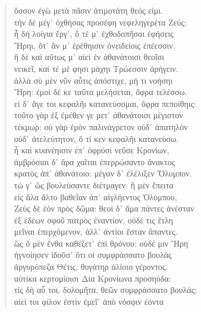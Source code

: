 \begin{Spacing}{1.5}
\begin{verse}
{\large\g ὅσσον ἐγὼ μετὰ πᾶσιν ἀτιμοτάτη θεός εἰμι.  } \\
{\large\g τὴν δὲ μέγ᾽ ὀχθήσας προσέφη νεφεληγερέτα Ζεύς:  } \\
{\large\g ἦ δὴ λοίγια ἔργ᾽, ὅ τέ μ᾽ ἐχθοδοπῆσαι ἐφήσεις  } \\
{\large\g Ἥρηι, ὅτ᾽ ἄν μ᾽ ἐρέθηισιν ὀνειδείοις ἐπέεσσιν.  } \\
{\large\g ἣ δὲ καὶ αὔτως μ᾽ αἰεὶ ἐν ἀθανάτοισι θεοῖσι  } \\
{\large\g νεικεῖ, καί τέ μέ φησι μάχηι Τρώεσσιν ἀρήγειν.  } \\
{\large\g ἀλλὰ σὺ μὲν νῦν αὖτις ἀπόστιχε, μή τι νοήσηι  } \\
{\large\g Ἥρη: ἐμοὶ δέ κε ταῦτα μελήσεται, ὄφρα τελέσσω.  } \\
{\large\g εἰ δ᾽ ἄγε τοι κεφαλῆι κατανεύσομαι, ὄφρα πεποίθηις:  } \\
{\large\g τοῦτο γὰρ ἐξ ἐμέθεν γε μετ᾽ ἀθανάτοισι μέγιστον  } \\
{\large\g τέκμωρ: οὐ γὰρ ἐμὸν παλινάγρετον οὐδ᾽ ἀπατηλόν   } \\
{\large\g οὐδ᾽ ἀτελεύτητον, ὅ τί κεν κεφαλῆι κατανεύσω.  } \\
{\large\g ἦ καὶ κυανέηισιν ἐπ᾽ ὀφρύσι νεῦσε Κρονίων,  } \\
{\large\g ἀμβρόσιαι δ᾽ ἄρα χαῖται ἐπερρώσαντο ἄνακτος  } \\
{\large\g κρατὸς ἀπ᾽ ἀθανάτοιο: μέγαν δ᾽ ἐλέλιξεν Ὄλυμπον.  } \\
{\large\g τώ γ᾽ ὣς βουλεύσαντε διέτμαγεν: ἣ μὲν ἔπειτα  } \\
{\large\g εἰς ἅλα ἄλτο βαθεῖαν ἀπ᾽ αἰγλήεντος Ὀλύμπου,  } \\
{\large\g Ζεὺς δὲ ἑὸν πρὸς δῶμα: θεοὶ δ᾽ ἅμα πάντες ἀνέσταν  } \\
{\large\g ἐξ ἑδέων σφοῦ πατρὸς ἐναντίον, οὐδέ τις ἔτλη  } \\
{\large\g μεῖναι ἐπερχόμενον, ἀλλ᾽ ἀντίοι ἔσταν ἅπαντες.  } \\
{\large\g ὣς ὃ μὲν ἔνθα καθέζετ᾽ ἐπὶ θρόνου: οὐδέ μιν Ἥρη  } \\
{\large\g ἠγνοίησεν ἰδοῦσ᾽ ὅτι οἱ συμφράσσατο βουλάς   } \\
{\large\g ἀργυρόπεζα Θέτις, θυγάτηρ ἁλίοιο γέροντος.  } \\
{\large\g αὐτίκα κερτομίοισι Δία Κρονίωνα προσηύδα:  } \\
{\large\g τίς δὴ αὖ τοι, δολομῆτα, θεῶν συμφράσσατο βουλάς;  } \\
{\large\g αἰεί τοι φίλον ἐστὶν ἐμεῖ᾽ ἀπὸ νόσφιν ἐόντα  } \\

\end{verse}
\end{Spacing}
